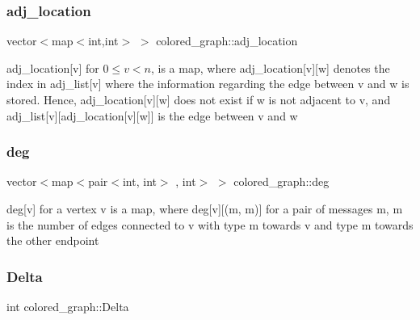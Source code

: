 \mbox{\label{classcolored__graph_ad657e7e86bee874d19dbc1765e1edaa7}} 
\subsubsection{\texorpdfstring{adj\+\_\+location}{adj\_location}}
{\footnotesize\ttfamily vector$<$map$<$int,int$>$ $>$ colored\+\_\+graph\+::adj\+\_\+location}



adj\+\_\+location\mbox{[}v\mbox{]} for $0 \leq v < n$, is a map, where adj\+\_\+location\mbox{[}v\mbox{]}\mbox{[}w\mbox{]} denotes the index in adj\+\_\+list\mbox{[}v\mbox{]} where the information regarding the edge between v and w is stored. Hence, adj\+\_\+location\mbox{[}v\mbox{]}\mbox{[}w\mbox{]} does not exist if w is not adjacent to v, and adj\+\_\+list\mbox{[}v\mbox{]}\mbox{[}adj\+\_\+location\mbox{[}v\mbox{]}\mbox{[}w\mbox{]}\mbox{]} is the edge between v and w 

\mbox{\label{classcolored__graph_ae3269d35c1b022bc70d195bebd4e1b8a}} 
\subsubsection{\texorpdfstring{deg}{deg}}
{\footnotesize\ttfamily vector$<$map$<$pair$<$int, int$>$ , int$>$ $>$ colored\+\_\+graph\+::deg}



deg\mbox{[}v\mbox{]} for a vertex v is a map, where deg\mbox{[}v\mbox{]}\mbox{[}(m, m\textquotesingle{})\mbox{]} for a pair of messages m, m\textquotesingle{} is the number of edges connected to v with type m towards v and type m\textquotesingle{} towards the other endpoint 

\mbox{\label{classcolored__graph_a5b0e93eb40a20dc815c809dee11edc12}} 
\subsubsection{\texorpdfstring{Delta}{Delta}}
{\footnotesize\ttfamily int colored\+\_\+graph\+::\+Delta}



